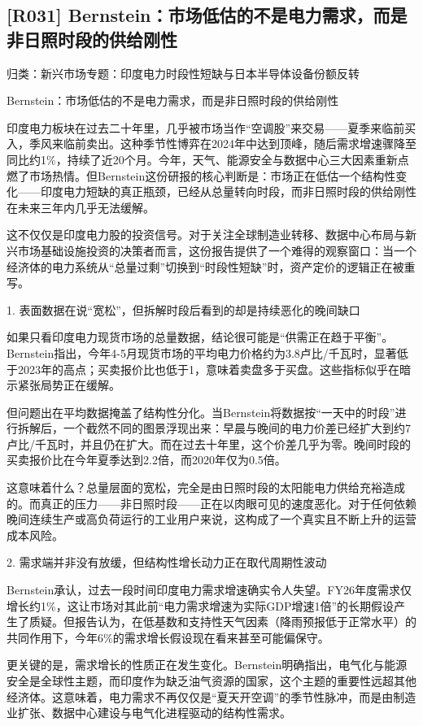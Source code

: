 \documentclass[11pt]{ctexart}
\begin{document}
\subsection{[R031] Bernstein：市场低估的不是电力需求，而是非日照时段的供给刚性}
{\small\color{refgray}归类：新兴市场专题：印度电力时段性短缺与日本半导体设备份额反转}

Bernstein：市场低估的不是电力需求，而是非日照时段的供给刚性

印度电力板块在过去二十年里，几乎被市场当作“空调股”来交易——夏季来临前买入，季风来临前卖出。这种季节性博弈在2024年中达到顶峰，随后需求增速骤降至同比约1\%，持续了近20个月。今年，天气、能源安全与数据中心三大因素重新点燃了市场热情。但Bernstein这份研报的核心判断是：市场正在低估一个结构性变化——印度电力短缺的真正瓶颈，已经从总量转向时段，而非日照时段的供给刚性在未来三年内几乎无法缓解。

这不仅仅是印度电力股的投资信号。对于关注全球制造业转移、数据中心布局与新兴市场基础设施投资的决策者而言，这份报告提供了一个难得的观察窗口：当一个经济体的电力系统从“总量过剩”切换到“时段性短缺”时，资产定价的逻辑正在被重写。

1. 表面数据在说“宽松”，但拆解时段后看到的却是持续恶化的晚间缺口

如果只看印度电力现货市场的总量数据，结论很可能是“供需正在趋于平衡”。Bernstein指出，今年4-5月现货市场的平均电力价格约为3.8卢比/千瓦时，显著低于2023年的高点；买卖报价比也低于1，意味着卖盘多于买盘。这些指标似乎在暗示紧张局势正在缓解。

但问题出在平均数据掩盖了结构性分化。当Bernstein将数据按“一天中的时段”进行拆解后，一个截然不同的图景浮现出来：早晨与晚间的电力价差已经扩大到约7卢比/千瓦时，并且仍在扩大。而在过去十年里，这个价差几乎为零。晚间时段的买卖报价比在今年夏季达到2.2倍，而2020年仅为0.5倍。

这意味着什么？总量层面的宽松，完全是由日照时段的太阳能电力供给充裕造成的。而真正的压力——非日照时段——正在以肉眼可见的速度恶化。对于任何依赖晚间连续生产或高负荷运行的工业用户来说，这构成了一个真实且不断上升的运营成本风险。

2. 需求端并非没有放缓，但结构性增长动力正在取代周期性波动

Bernstein承认，过去一段时间印度电力需求增速确实令人失望。FY26年度需求仅增长约1\%，这让市场对其此前“电力需求增速为实际GDP增速1倍”的长期假设产生了质疑。但报告认为，在低基数和支持性天气因素（降雨预报低于正常水平）的共同作用下，今年6\%的需求增长假设现在看来甚至可能偏保守。

更关键的是，需求增长的性质正在发生变化。Bernstein明确指出，电气化与能源安全是全球性主题，而印度作为缺乏油气资源的国家，这个主题的重要性远超其他经济体。这意味着，电力需求不再仅仅是“夏天开空调”的季节性脉冲，而是由制造业扩张、数据中心建设与电气化进程驱动的结构性需求。
\end{document}
